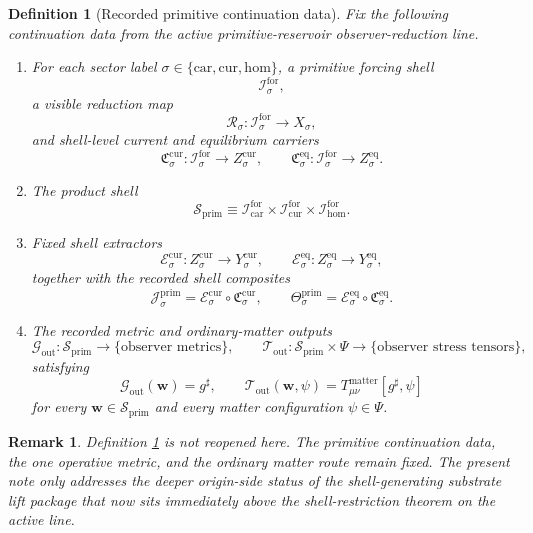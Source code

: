 \documentclass[11pt]{article}
\newcommand{\CompletedMetric}{g^{\sharp}}
\newcommand{\Car}{\mathrm{car}}
\newcommand{\Cur}{\mathrm{cur}}
\newcommand{\Hom}{\mathrm{hom}}
\newcommand{\ForSpace}[1]{\mathcal I_{#1}^{\mathrm{for}}}
\newcommand{\PrimShell}{\mathcal S_{\mathrm{prim}}}
\newcommand{\Reduction}[1]{\mathcal R_{#1}}
\newcommand{\CurrentCarrier}[1]{\mathfrak C_{#1}^{\mathrm{cur}}}
\newcommand{\EqCarrier}[1]{\mathfrak C_{#1}^{\mathrm{eq}}}
\newcommand{\CurrentExtract}[1]{\mathscr E_{#1}^{\mathrm{cur}}}
\newcommand{\EqExtract}[1]{\mathscr E_{#1}^{\mathrm{eq}}}
\newcommand{\PrimCurrent}[1]{\mathcal J_{#1}^{\mathrm{prim}}}
\newcommand{\PrimTheta}[1]{\Theta_{#1}^{\mathrm{prim}}}
\newcommand{\MetricOut}{\mathscr G_{\mathrm{out}}}
\newcommand{\MatterOut}{\mathscr T_{\mathrm{out}}}
\newtheorem{definition}{Definition}
\newtheorem{remark}{Remark}
\begin{document}
\begin{definition}[Recorded primitive continuation data]
\label{def:fixed}
Fix the following continuation data from the active primitive-reservoir observer-reduction line.
\begin{enumerate}
    \item For each sector label \(\sigma\in\{\Car,\Cur,\Hom\}\), a primitive forcing shell
    \[
    \ForSpace{\sigma},
    \]
    a visible reduction map
    \[
    \Reduction{\sigma}:\ForSpace{\sigma}\to X_{\sigma},
    \]
    and shell-level current and equilibrium carriers
    \[
    \CurrentCarrier{\sigma}:\ForSpace{\sigma}\to Z_{\sigma}^{\mathrm{cur}},
    \qquad
    \EqCarrier{\sigma}:\ForSpace{\sigma}\to Z_{\sigma}^{\mathrm{eq}}.
    \]
    \item The product shell
    \[
    \PrimShell
    \equiv
    \ForSpace{\Car}\times \ForSpace{\Cur}\times \ForSpace{\Hom}.
    \]
    \item Fixed shell extractors
    \[
    \CurrentExtract{\sigma}:Z_{\sigma}^{\mathrm{cur}}\to Y_{\sigma}^{\mathrm{cur}},
    \qquad
    \EqExtract{\sigma}:Z_{\sigma}^{\mathrm{eq}}\to Y_{\sigma}^{\mathrm{eq}},
    \]
    together with the recorded shell composites
    \begin{equation}
    \PrimCurrent{\sigma}
    =
    \CurrentExtract{\sigma}\circ \CurrentCarrier{\sigma},
    \qquad
    \PrimTheta{\sigma}
    =
    \EqExtract{\sigma}\circ \EqCarrier{\sigma}.
    \label{eq:primcomposites}
    \end{equation}
    \item The recorded metric and ordinary-matter outputs
    \[
    \MetricOut:\PrimShell\to\{\text{observer metrics}\},
    \qquad
    \MatterOut:\PrimShell\times\Psi\to\{\text{observer stress tensors}\},
    \]
    satisfying
    \begin{equation}
    \MetricOut(\mathbf w)=\CompletedMetric,
    \qquad
    \MatterOut(\mathbf w,\psi)
    =
    T_{\mu\nu}^{\mathrm{matter}}[\CompletedMetric,\psi]
    \label{eq:fixedoutputs}
    \end{equation}
    for every \(\mathbf w\in\PrimShell\) and every matter configuration \(\psi\in\Psi\).
\end{enumerate}
\end{definition}

\begin{remark}
Definition \ref{def:fixed} is not reopened here. The primitive continuation data, the one operative metric, and the ordinary matter route remain fixed. The present note only addresses the deeper origin-side status of the shell-generating substrate lift package that now sits immediately above the shell-restriction theorem on the active line.
\end{remark}
\end{document}
